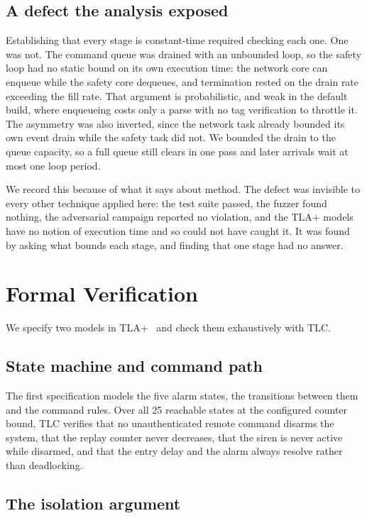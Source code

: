 \subsection{A defect the analysis exposed}

Establishing that every stage is constant-time required checking each one. One was not. The
command queue was drained with an unbounded loop, so the safety loop had no static bound on its
own execution time: the network core can enqueue while the safety core dequeues, and termination
rested on the drain rate exceeding the fill rate. That argument is probabilistic, and weak in the
default build, where enqueueing costs only a parse with no tag verification to throttle it. The
asymmetry was also inverted, since the network task already bounded its own event drain while the
safety task did not. We bounded the drain to the queue capacity, so a full queue still clears in
one pass and later arrivals wait at most one loop period.

We record this because of what it says about method. The defect was invisible to every other
technique applied here: the test suite passed, the fuzzer found nothing, the adversarial campaign
reported no violation, and the TLA+ models have no notion of execution time and so could not have
caught it. It was found by asking what bounds each stage, and finding that one stage had no
answer.

\section{Formal Verification}\label{sec:formal}

We specify two models in TLA+~\cite{lamport2002} and check them exhaustively with TLC.

\subsection{State machine and command path}

The first specification models the five alarm states, the transitions between them and the
command rules. Over all 25 reachable states at the configured counter bound, TLC verifies that no
unauthenticated remote command disarms the system, that the replay counter never decreases, that
the siren is never active while disarmed, and that the entry delay and the alarm always resolve
rather than deadlocking.

\subsection{The isolation argument}


